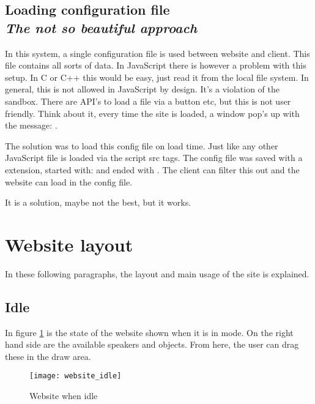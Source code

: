 \subsection{Loading configuration file\\
    \small\nimbus\textit{The not so beautiful approach}}
In this system, a single configuration file is used between website and client.
This file contains all sorts of data.
In JavaScript there is however a problem with this setup. In C or C++ this would be easy, just read it from the local file system.
In general, this is not allowed in JavaScript by design. It's a violation of the sandbox.
There are API's to load a file via a button etc, but this is not user friendly.
Think about it, every time the site is loaded, a window pop's up with the message:
.

The solution was to load this config file on load time. Just like any other JavaScript file is loaded via the script src tags.
The config file was saved with a  extension, started with:  and ended with \say{;}.
The client can filter this out and the website can load in the config file.

It is a solution, maybe not the best, but it works.

\section{Website layout}
In these following paragraphs, the layout and main usage of the site is explained.

\subsection{Idle}
\label{sub:website_idle}
In figure \ref{fig:website_idle} is the state of the website shown when it is in  mode.
On the right hand side are the available speakers and objects.
From here, the user can drag these in the draw area.

\begin{figure}[H]
    \centering
    \texttt{[image: website\_idle]}
    \caption{Website when idle}
    \label{fig:website_idle}
\end{figure}

